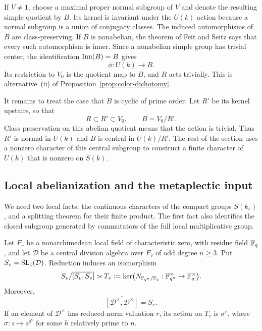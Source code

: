 If $V\ne1$, choose a maximal proper normal subgroup of $V$ and denote
the resulting simple quotient by $B$.  Its kernel is invariant under
the $U(k)$ action because a normal subgroup is a union of conjugacy
classes.  The induced automorphisms of $B$ are class-preserving.  If $B$
is nonabelian, the theorem of Feit and Seitz
\cite[Theorem~C]{FeitSeitz} says that every such automorphism is inner.
Since a nonabelian simple group has trivial center, the identification
$\operatorname{Inn}(B)=B$ gives
\[
 \phi:U(k)\longrightarrow B.
\]
Its restriction to $V_0$ is the quotient map to $B$, and $R$ acts
trivially.  This is alternative~\textup{(ii)} of
Proposition~\ref{prop:color-dichotomy}.

It remains to treat the case that $B$ is cyclic of prime order.  Let
$R'$ be its kernel upstairs, so that
\begin{equation}\label{eq:colors-central-quotient}
 R\subset R'\subset V_0,\qquad B=V_0/R'.
\end{equation}
Class preservation on this abelian quotient means that the action is
trivial.  Thus $R'$ is normal in $U(k)$ and $B$ is central in $U(k)/R'$.
The rest of the section uses a nonzero character of this central
subgroup to construct a finite character of $U(k)$ that is nonzero on
$S(k)$.

\subsection{Local abelianization and the metaplectic input}

We need two local facts: the continuous characters of the compact groups
$S(k_v)$, and a splitting theorem for their finite product.  The first
fact also identifies the closed subgroup generated by commutators of
the full local multiplicative group.

\begin{lemma}\label{lem:colors-local-abelianization}
Let $F_v$ be a nonarchimedean local field of characteristic zero, with
residue field $\mathbb F_q$, and let $\mathcal D$ be a central division algebra
over $F_v$ of odd degree $n\geq3$.  Put $S_v=\operatorname{SL}_1(\mathcal D)$.
Reduction induces an isomorphism
\[
 S_v/\overline{[S_v,S_v]}
 \simeq T_v:=\ker\bigl(N_{\mathbb F_{q^n}/\mathbb F_q}:
                       \mathbb F_{q^n}^\times\to\mathbb F_q^\times\bigr).
\]
Moreover,
\[
 \overline{[\mathcal D^\times,\mathcal D^\times]}=S_v.
\]
If an element of $\mathcal D^\times$ has reduced-norm valuation $r$,
its action on $T_v$ is $\sigma^r$, where $\sigma:z\mapsto z^{q^h}$
for some $h$ relatively prime to $n$.
\end{lemma}

